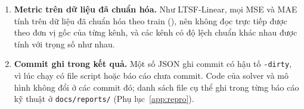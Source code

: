 \begin{enumerate}[label=\arabic*., ref=\arabic*]
    \item \label{lim:metrics}\textbf{Metric trên dữ liệu đã chuẩn hóa.} Như LTSF-Linear, mọi MSE và MAE tính trên dữ liệu đã chuẩn hóa theo train (), nên không đọc trực tiếp được theo đơn vị gốc của từng kênh, và các kênh có độ lệch chuẩn khác nhau được tính với trọng số như nhau.
    \item \label{lim:commits}\textbf{Commit ghi trong kết quả.} Một số JSON ghi commit có hậu tố \texttt{-dirty}, vì lúc chạy có file script hoặc báo cáo chưa commit. Code của solver và mô hình không đổi ở các commit đó; danh sách file cụ thể ghi trong từng báo cáo kỹ thuật ở \texttt{docs/reports/} (Phụ lục~\ref{app:repro}).
\end{enumerate}
